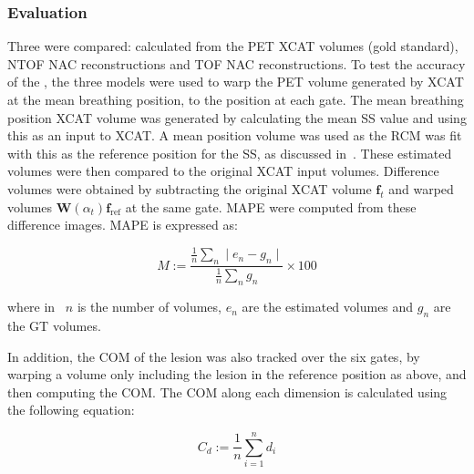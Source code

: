             \subsubsection{Evaluation} \label{sec:impact_of_tof_on_respiratory_motion_model_estimation_using_pre_gated_no_intra_cycle_motion_nac_pet_methods_evaluation}
                Three  were compared: calculated from the \gls{PET} \gls{XCAT} volumes (gold standard), \gls{NTOF} \gls{NAC} reconstructions and \gls{TOF} \gls{NAC} reconstructions. To test the accuracy of the , the three models were used to warp the \gls{PET} volume generated by \gls{XCAT} at the mean breathing position, to the position at each gate. The mean breathing position \gls{XCAT} volume was generated by calculating the mean \gls{SS} value and using this as an input to \gls{XCAT}. A mean position volume was used as the \gls{RCM} was fit with this as the reference position for the \gls{SS}, as discussed in~. These estimated volumes were then compared to the original \gls{XCAT} input volumes. Difference volumes were obtained by subtracting the original \gls{XCAT} volume $\mathbf{f}_t$ and warped volumes $\mathbf{W}(\alpha_t) \mathbf{f}_\mathrm{ref}$ at the same gate. \gls{MAPE} were computed from these difference images. \gls{MAPE} is expressed as:
                
                \begin{equation} \label{eq:impact_of_tof_on_respiratory_motion_model_estimation_using_pre_gated_no_intra_cycle_motion_nac_pet_methods_mape}
                   M := \frac{\frac{1}{n}\sum_{n}\mid e_n - g_n \mid}{\frac{1}{n}\sum_{n}g_n} \times 100
                \end{equation}
                
                \noindent where in~ $n$ is the number of volumes, $e_n$ are the estimated volumes and $g_n$ are the \gls{GT} volumes.
                
                In addition, the \gls{COM} of the lesion was also tracked over the six gates, by warping a volume only including the lesion in the reference position as above, and then computing the \gls{COM}. The \gls{COM} along each dimension is calculated using the following equation:
                
                \begin{equation} \label{eq:impact_of_tof_on_respiratory_motion_model_estimation_using_pre_gated_no_intra_cycle_motion_nac_pet_methods_com}
                   C_{d} := \frac{1}{n}\sum_{i = 1}^{n} d_{i}
                \end{equation}
                
